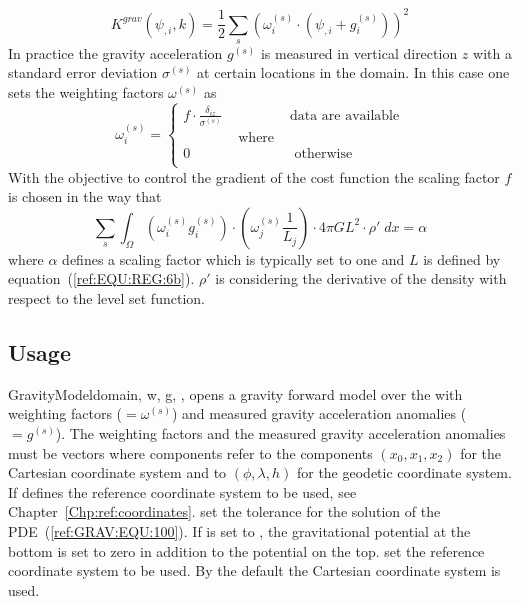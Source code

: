 \begin{equation}\label{ref:GRAV:EQU:10}
K^{grav}(\psi_{,i},k) = \frac{1}{2}\sum_{s} ( \omega^{(s)}_i \cdot (\psi_{,i}+ g^{(s)}_i) ) ^2
\end{equation} 
In practice the gravity acceleration $g^{(s)}$ is measured in vertical
direction $z$ with a standard error deviation $\sigma^{(s)}$ at certain
locations in the domain.
In this case one sets the weighting factors $\omega^{(s)}$ as
\begin{equation}\label{ref:GRAV:EQU:11}
\omega^{(s)}_i 
= \left\{
\begin{array}{lcl}
f \cdot  \frac{\delta_{iz}}{\sigma^{(s)}} & & \mbox{data are available} \\
& \mbox{ where } & \\
0 & & \mbox{ otherwise } \\
\end{array}
\right.
\end{equation} 
With the objective to control the 
gradient of the cost function 
the scaling factor $f$ is chosen in the way that
\begin{equation}\label{ref:GRAV:EQU:12}
\sum_{s} \int_{\Omega} ( \omega^{(s)}_i g^{(s)}_i ) \cdot ( \omega^{(s)}_j \frac{1}{L_j} ) \cdot 4\pi G L^2 \cdot \rho' \;  dx =\alpha
\end{equation} 
where $\alpha$ defines a scaling factor which is typically set to one and $L$ is defined by equation~(\ref{ref:EQU:REG:6b}). $\rho'$ is considering the 
derivative of the density with respect to the level set function. 


\subsection{Usage}

\begin{classdesc}{GravityModel}{domain, 
w, g,
,
}
opens a gravity forward model over the \Domain {} with 
weighting factors  ($=\omega^{(s)}$) and measured gravity acceleration anomalies  ($=g^{(s)}$).
The weighting factors and the  measured gravity acceleration anomalies must be vectors
where components refer to the components 
$(x_0,x_1,x_2)$ for the Cartesian coordinate system 
and to $(\phi, \lambda, h)$ for the geodetic coordinate system. 
If  defines the reference coordinate system to be used, see Chapter~\ref{Chp:ref:coordinates}.
 set the tolerance for the solution of the PDE~(\ref{ref:GRAV:EQU:100}).
If  is set to  \True, the gravitational potential 
at the bottom is set to zero in addition to the potential on the top. 
 set the reference coordinate system to be used. By the default the 
Cartesian coordinate system is used.
\end{classdesc}

